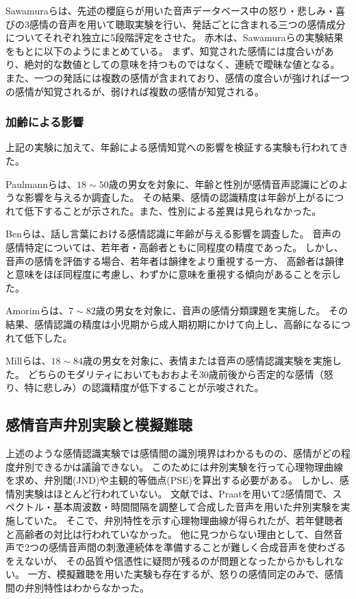 Sawamuraらは、先述の櫻庭らが用いた音声データベース中の怒り・悲しみ・喜びの3感情の音声を用いて聴取実験を行い、発話ごとに含まれる三つの感情成分についてそれぞれ独立に5段階評定をさせた\cite{sawamura2007Emo}。
赤木は、Sawamuraらの実験結果をもとに以下のようにまとめている\cite{akagi2010EmoSpace}。
まず、知覚された感情には度合いがあり、絶対的な数値としての意味を持つものではなく、連続で曖昧な値となる。
また、一つの発話には複数の感情が含まれており、感情の度合いが強ければ一つの感情が知覚されるが、弱ければ複数の感情が知覚される。


\subsubsection{加齢による影響}
上記の実験に加えて、年齢による感情知覚への影響を検証する実験も行われてきた。

Paulmannらは、$18 \sim 50$歳の男女を対象に、年齢と性別が感情音声認識にどのような影響を与えるか調査した\cite{paulmann2008aging}。
その結果、感情の認識精度は年齢が上がるにつれて低下することが示された。また、性別による差異は見られなかった。

Benらは、話し言葉における感情認識に年齢が与える影響を調査した\cite{ben2019age}。
音声の感情特定については、若年者・高齢者ともに同程度の精度であった。
しかし、音声の感情を評価する場合、若年者は韻律をより重視する一方、
高齢者は韻律と意味をほぼ同程度に考慮し、わずかに意味を重視する傾向があることを示した。

Amorimらは、$7 \sim 82$歳の男女を対象に、音声の感情分類課題を実施した\cite{amorim2021changes}。
その結果、感情認識の精度は小児期から成人期初期にかけて向上し、高齢になるにつれて低下した。

Millらは、$18 \sim 84$歳の男女を対象に、表情または音声の感情認識実験を実施した。
どちらのモダリティにおいてもおおよそ30歳前後から否定的な感情（怒り、特に悲しみ）の認識精度が低下することが示唆された。


\subsection{感情音声弁別実験と模擬難聴}
上述のような感情認識実験では感情間の識別境界はわかるものの、感情がどの程度弁別できるかは議論できない。
このためには弁別実験を行って心理物理曲線を求め、弁別閾(JND)や主観的等価点(PSE)を算出する必要がある。
しかし、感情別実験はほとんど行われていない。
文献\cite{laukka2005categorical}では、Praat\cite{boersma2001speak}を用いて2感情間で、スペクトル・基本周波数・時間間隔を調整して合成した音声を用いた弁別実験を実施していた。
そこで、弁別特性を示す心理物理曲線が得られたが、若年健聴者と高齢者の対比は行われていなかった。
他に見つからない理由として、自然音声で2つの感情音声間の刺激連続体を準備することが難しく合成音声を使わざるをえないが、
その品質や信憑性に疑問が残るのが問題となったからかもしれない。
一方、模擬難聴を用いた実験も存在するが、怒りの感情同定\cite{morgan2022perceived}のみで、感情間の弁別特性はわからなかった。

